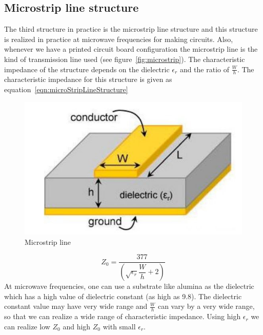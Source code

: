 \subsection{Microstrip line structure}
The third structure in practice is the microstrip line structure and this structure is realized in practice at microwave frequencies for making circuits. Also, whenever we have a printed circuit board configuration the microstrip line is the kind of transmission line used (see figure~\ref{fig:microstrip}). The characteristic impedance of the structure depends on the dielectric $\epsilon_{r}$ and the ratio of $\frac{W}{h}$. The characteristic impedance for this structure is given as equation~\ref{eqn:microStripLineStructure}
\begin{figure}[h]
\centering
\includegraphics[width=1\linewidth]{graphics/microStripLineStructure}
\caption{Microstrip line}
\label{fig:microStripLineStructure}
\end{figure}

\begin{equation}
Z_0 =\dfrac{377}{\left(\sqrt{\epsilon_r}\dfrac{W}{h}+2\right)}
\label{eqn:microStripLineStructure}
\end{equation}
At microwave frequencies, one can use a substrate like alumina as the dielectric which has a high value of dielectric constant (as high as 9.8). The dielectric constant value may have very wide range and $\frac{W}{h}$ can vary by a very wide range, so that we can realize a wide range of characteristic impedance. Using high $\epsilon_r$ we can realize low $Z_0$ and high $Z_0$ with small $\epsilon_r$.

